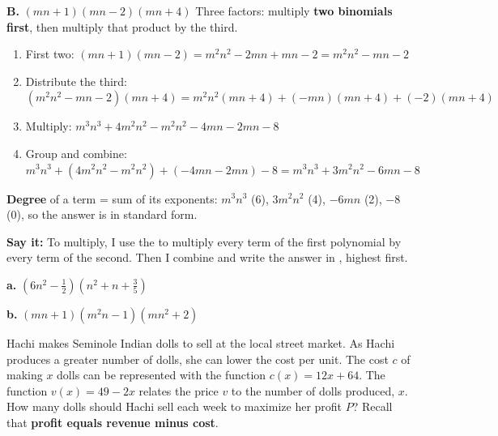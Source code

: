 \textbf{B.} $(mn+1)(mn-2)(mn+4)$ \quad Three factors: multiply \textbf{two binomials first}, then multiply that product by the third.
\begin{enumerate}[label=\arabic*.]
\item First two: $(mn+1)(mn-2)=m^2n^2-2mn+mn-2=m^2n^2-mn-2$
\item Distribute the third: $(m^2n^2-mn-2)(mn+4)=m^2n^2(mn+4)+(-mn)(mn+4)+(-2)(mn+4)$
\item Multiply: $m^3n^3+4m^2n^2-m^2n^2-4mn-2mn-8$
\item Group and combine: $m^3n^3+(4m^2n^2-m^2n^2)+(-4mn-2mn)-8=\boxed{m^3n^3+3m^2n^2-6mn-8}$
\end{enumerate}
{\small \textbf{Degree} of a term = sum of its exponents: $m^3n^3$ (6), $3m^2n^2$ (4), $-6mn$ (2), $-8$ (0), so the answer is in standard form.}

\textbf{Say it:} To multiply, I use the \blank[3.6cm] to multiply every term of the first polynomial by every term of the second. Then I combine \blank[2.4cm] and write the answer in \blank[2.8cm], highest \blank[2cm] first. \lines[1]

\newpage

\textbf{a.} $\left(6n^2-\tfrac12\right)\left(n^2+n+\tfrac35\right)$
\lines[3]

\textbf{b.} $(mn+1)(m^2n-1)(mn^2+2)$
\lines[4]

Hachi makes Seminole Indian dolls to sell at the local street market. As Hachi produces a greater number of dolls, she can lower the cost per unit. The cost $c$ of making $x$ dolls can be represented with the function $c(x)=12x+64$. The function $v(x)=49-2x$ relates the price $v$ to the number of dolls produced, $x$. How many dolls should Hachi sell each week to maximize her profit $P$? Recall that \textbf{profit equals revenue minus cost}.

